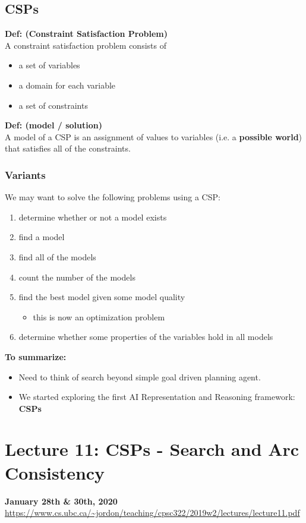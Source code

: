 \documentclass{article}
\def\blu#1{{\color{blu}#1}}
\def\red#1{{\color{red}#1}}
\theoremstyle{definition}
\begin{document}
\subsection*{CSPs}
\textbf{Def: (Constraint Satisfaction Problem)} \\ 
A constraint satisfaction problem consists of
\begin{itemize}
	\item a set of variables
\item a domain for each variable
\item a set of constraints
\end{itemize}
\textbf{Def: (model / solution)} \\
A \blu{model} of a CSP is an assignment of values to variables (i.e. a \textbf{possible world}) that satisfies all of the constraints.


\subsubsection*{Variants}
We may want to solve the following problems using a CSP:
\begin{enumerate}[label = \Alph*) ]
	\item determine whether or not a model \blu{exists}
	\item \blu{find} a model
	\item \blu{find all} of the models
	\item \red{count the number of the models}
	\item find the \blu{best} model given some model quality 
	\begin{itemize}
		\item this is now an optimization problem
	\end{itemize}
	\item \red{determine whether some properties of the variables hold in all models}
\end{enumerate}

\textbf{To summarize:}
\begin{itemize}
	\item Need to think of search beyond simple goal driven planning agent.
\item We started exploring the first AI Representation and Reasoning framework: \textbf{CSPs}

\end{itemize}

\newpage

\section*{Lecture 11: CSPs - Search and Arc Consistency}
\textbf{January 28th \& 30th, 2020} \\
\url{https://www.cs.ubc.ca/~jordon/teaching/cpsc322/2019w2/lectures/lecture11.pdf}
\end{document}
